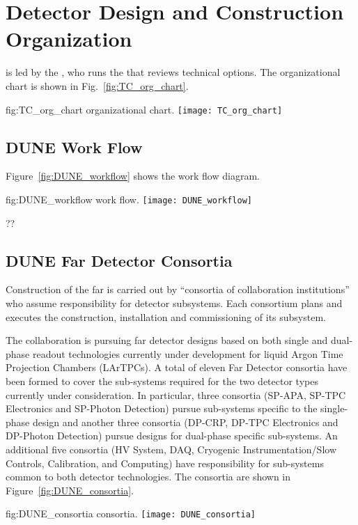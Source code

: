 \chapter{Detector Design and Construction Organization}
\label{vl:tc-overview}

 is led by the , who runs the  that
reviews  technical options. The  organizational
chart is shown in Fig.~\ref{fig:TC_org_chart}.
\begin{dunefigure}{fig:TC_org_chart}
  {  organizational chart.}
  \texttt{[image: TC\_org\_chart]}
\end{dunefigure}


\section{DUNE Work Flow}
\label{sec:workflow}

Figure~\ref{fig:DUNE_workflow} shows the  work flow diagram.
\begin{dunefigure}{fig:DUNE_workflow}
  { work flow.}
  \texttt{[image: DUNE\_workflow]}
\end{dunefigure}

??

\section{DUNE Far Detector Consortia}
\label{sec:consortia}

Construction of the  far  is carried out
by ``consortia of collaboration institutions'' who assume
responsibility for detector subsystems.  Each consortium plans and
executes the construction, installation and commissioning of its
subsystem.

The  collaboration is pursuing far detector designs based
on both single and dual-phase readout technologies currently under
development for liquid Argon Time Projection Chambers (LArTPCs).  A
total of eleven Far Detector consortia have been formed to cover the
sub-systems required for the two detector types currently under
consideration.  In particular, three consortia (SP-APA, SP-TPC
Electronics and SP-Photon Detection) pursue sub-systems specific to
the single-phase design and another three consortia (DP-CRP, DP-TPC
Electronics and DP-Photon Detection) pursue designs for dual-phase
specific sub-systems.  An additional five consortia (HV System, DAQ,
Cryogenic Instrumentation/Slow Controls, Calibration, and Computing)
have responsibility for sub-systems common to both detector
technologies. The consortia are shown in Figure~\ref{fig:DUNE_consortia}.
\begin{dunefigure}{fig:DUNE_consortia}
  { consortia.}
  \texttt{[image: DUNE\_consortia]}
\end{dunefigure}




